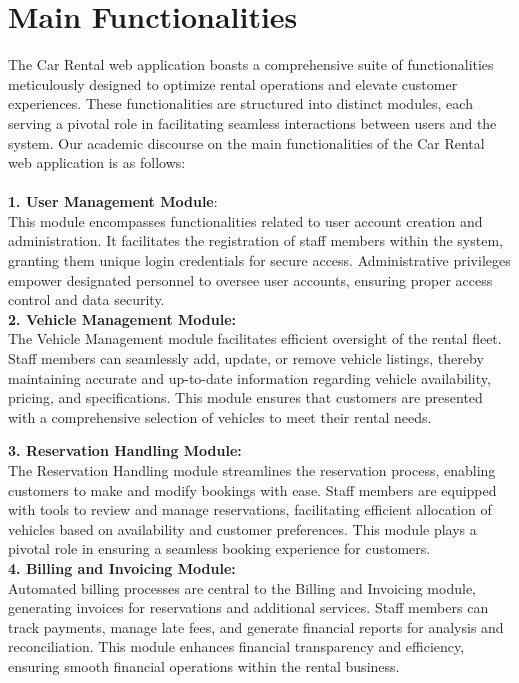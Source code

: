 \section{Main Functionalities}
The Car Rental web application boasts a comprehensive suite of functionalities meticulously designed to optimize rental operations and elevate customer experiences. These functionalities are structured into distinct modules, each serving a pivotal role in facilitating seamless interactions between users and the system. Our academic discourse on the main functionalities of the Car Rental web application is as follows:\\\\

\textbf{1. User Management Module}:\\
This module encompasses functionalities related to user account creation and administration. It facilitates the registration of staff members within the system, granting them unique login credentials for secure access. Administrative privileges empower designated personnel to oversee user accounts, ensuring proper access control and data security.\\

\textbf{2. Vehicle Management Module:\\}
The Vehicle Management module facilitates efficient oversight of the rental fleet. Staff members can seamlessly add, update, or remove vehicle listings, thereby maintaining accurate and up-to-date information regarding vehicle availability, pricing, and specifications. This module ensures that customers are presented with a comprehensive selection of vehicles to meet their rental needs.

\textbf{3. Reservation Handling Module:\\}
The Reservation Handling module streamlines the reservation process, enabling customers to make and modify bookings with ease. Staff members are equipped with tools to review and manage reservations, facilitating efficient allocation of vehicles based on availability and customer preferences. This module plays a pivotal role in ensuring a seamless booking experience for customers.\\

\textbf{4. Billing and Invoicing Module:\\}
 Automated billing processes are central to the Billing and Invoicing module, generating invoices for reservations and additional services. Staff members can track payments, manage late fees, and generate financial reports for analysis and reconciliation. This module enhances financial transparency and efficiency, ensuring smooth financial operations within the rental business.\\

